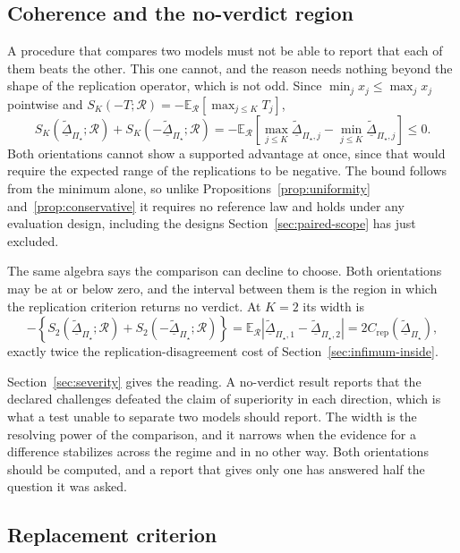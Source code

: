 \documentclass[11pt]{article}
\newcommand{\Regime}{\mathcal{R}}
\newcommand{\PSet}{\Pi_\star}
\newcommand{\E}{\mathbb{E}}
\newcommand{\RobDta}{\underline{\widetilde{\Delta}}_{\PSet}}
\theoremstyle{remark}
\begin{document}
\subsection{Coherence and the no-verdict region}
\label{sec:orientation}

A procedure that compares two models must not be able to report that each of them beats the other. This one cannot, and the reason needs nothing beyond the shape of the replication operator, which is not odd. Since $\min_j x_j\leq\max_j x_j$ pointwise and $S_K(-T;\Regime)=-\E_{\Regime}[\max_{j\leq K}T_j]$,
\begin{equation}
S_K(\RobDta;\Regime)
+
S_K(-\RobDta;\Regime)
=
-\E_{\Regime}
\left[
\max_{j\leq K}\underline{\widetilde{\Delta}}_{\PSet,j}-\min_{j\leq K}\underline{\widetilde{\Delta}}_{\PSet,j}
\right]
\leq
0 .
\label{eq:orientation}
\end{equation}
Both orientations cannot show a supported advantage at once, since that would require the expected range of the replications to be negative. The bound follows from the minimum alone, so unlike Propositions~\ref{prop:uniformity} and~\ref{prop:conservative} it requires no reference law and holds under any evaluation design, including the designs Section~\ref{sec:paired-scope} has just excluded.

The same algebra says the comparison can decline to choose. Both orientations may be at or below zero, and the interval between them is the region in which the replication criterion returns no verdict. At $K=2$ its width is
\[
-\left\{
S_2(\RobDta;\Regime)+S_2(-\RobDta;\Regime)
\right\}
=
\E_{\Regime}
\left|
\underline{\widetilde{\Delta}}_{\PSet,1}
-
\underline{\widetilde{\Delta}}_{\PSet,2}
\right|
=
2C_{\mathrm{rep}}(\RobDta),
\]
exactly twice the replication-disagreement cost of Section~\ref{sec:infimum-inside}.

Section~\ref{sec:severity} gives the reading. A no-verdict result reports that the declared challenges defeated the claim of superiority in each direction, which is what a test unable to separate two models should report. The width is the resolving power of the comparison, and it narrows when the evidence for a difference stabilizes across the regime and in no other way. Both orientations should be computed, and a report that gives only one has answered half the question it was asked.

\subsection{Replacement criterion}
\label{sec:replacement}
\end{document}
